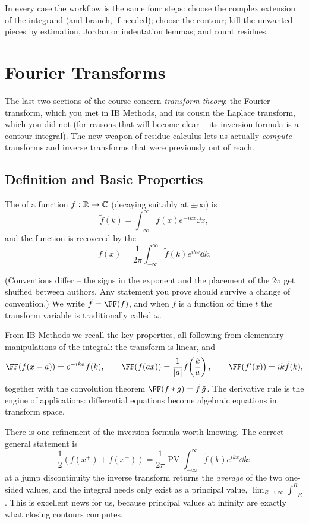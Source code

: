 \documentclass[a4paper]{scrartcl}
\newcommand{\pv}{\operatorname{PV}}
\begin{document}
In every case the workflow is the same four steps: choose the complex extension of the integrand (and branch, if needed); choose the contour; kill the unwanted pieces by estimation, Jordan or indentation lemmas; and count residues.

\section{Fourier Transforms}

The last two sections of the course concern \emph{transform theory}: the Fourier transform, which you met in IB Methods, and its cousin the Laplace transform, which you did not (for reasons that will become clear -- its inversion formula is a contour integral). The new weapon of residue calculus lets us actually \emph{compute} transforms and inverse transforms that were previously out of reach.

\subsection{Definition and Basic Properties}

\begin{definition}
	The  of a function $f : \mathbb{R} \to \mathbb{C}$ (decaying suitably at $\pm\infty$) is
	$$
	\tilde{f}(k) = \int_{-\infty}^\infty f(x) e^{-ikx} \dd x,
	$$
	and the function is recovered by the 
	$$
	f(x) = \frac{1}{2\pi} \int_{-\infty}^\infty \tilde{f}(k) e^{ikx} \dd k.
	$$
\end{definition}

(Conventions differ -- the signs in the exponent and the placement of the $2\pi$ get shuffled between authors. Any statement you prove should survive a change of convention.) We write $\tilde f = \FF(f)$, and when $f$ is a function of time $t$ the transform variable is traditionally called $\omega$.

From IB Methods we recall the key properties, all following from elementary manipulations of the integral: the transform is linear, and
$$
\FF(f(x - a)) = e^{-ika}\tilde f(k), \qquad
\FF(f(ax)) = \frac{1}{|a|} \tilde f\!\left(\frac ka\right), \qquad
\FF(f'(x)) = ik \tilde f(k),
$$
together with the convolution theorem $\FF(f * g) = \tilde f \, \tilde g$. The derivative rule is the engine of applications: differential equations become algebraic equations in transform space.

There is one refinement of the inversion formula worth knowing. The correct general statement is
$$
\frac{1}{2}\left(f(x^+) + f(x^-)\right) = \frac{1}{2\pi} \pv \int_{-\infty}^\infty \tilde f(k) e^{ikx} \dd k :
$$
at a jump discontinuity the inverse transform returns the \emph{average} of the two one-sided values, and the integral needs only exist as a principal value, $\lim_{R \to \infty} \int_{-R}^R$. This is excellent news for us, because principal values at infinity are exactly what closing contours computes.
\end{document}
